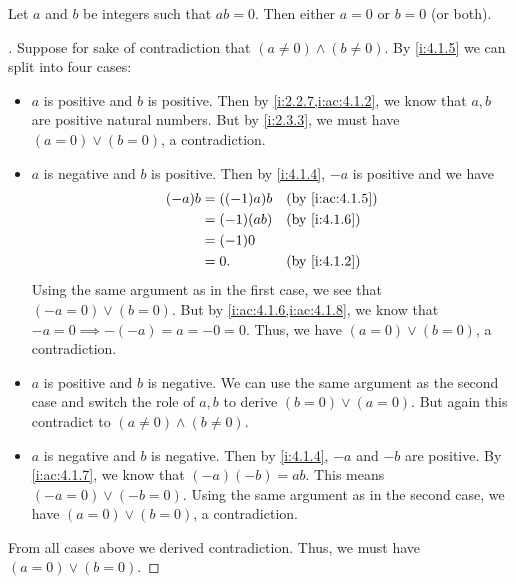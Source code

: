 \begin{prop}\label{i:4.1.8}
  Let \(a\) and \(b\) be integers such that \(ab = 0\).
  Then either \(a = 0\) or \(b = 0\) (or both).
\end{prop}

\begin{proof}[]
  Suppose for sake of contradiction that \((a \neq 0) \land (b \neq 0)\).
  By \cref{i:4.1.5} we can split into four cases:
  \begin{itemize}
    \item \(a\) is positive and \(b\) is positive.
          Then by \cref{i:2.2.7,i:ac:4.1.2}, we know that \(a, b\) are positive natural numbers.
          But by \cref{i:2.3.3}, we must have \((a = 0) \lor (b = 0)\), a contradiction.
    \item \(a\) is negative and \(b\) is positive.
          Then by \cref{i:4.1.4}, \(-a\) is positive and we have
          \begin{align*}
            (-a) b & = ((-1) a) b &  & \by{i:ac:4.1.5} \\
                   & = (-1) (ab)  &  & \by{i:4.1.6}    \\
                   & = (-1) 0                          \\
                   & = 0.         &  & \by{i:4.1.2}
          \end{align*}
          Using the same argument as in the first case, we see that \((-a = 0) \lor (b = 0)\).
          But by \cref{i:ac:4.1.6,i:ac:4.1.8}, we know that \(-a = 0 \implies -(-a) = a = -0 = 0\).
          Thus, we have \((a = 0) \lor (b = 0)\), a contradiction.
    \item \(a\) is positive and \(b\) is negative.
          We can use the same argument as the second case and switch the role of \(a, b\) to derive \((b = 0) \lor (a = 0)\).
          But again this contradict to \((a \neq 0) \land (b \neq 0)\).
    \item \(a\) is negative and \(b\) is negative.
          Then by \cref{i:4.1.4}, \(-a\) and \(-b\) are positive.
          By \cref{i:ac:4.1.7}, we know that \((-a)(-b) = ab\).
          This means \((-a = 0) \lor (-b = 0)\).
          Using the same argument as in the second case, we have \((a = 0) \lor (b = 0)\), a contradiction.
  \end{itemize}
  From all cases above we derived contradiction.
  Thus, we must have \((a = 0) \lor (b = 0)\).
\end{proof}

